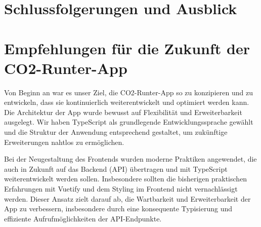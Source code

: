 \section{Schlussfolgerungen und Ausblick }

\section{Empfehlungen für die Zukunft der CO2-Runter-App}

Von Beginn an war es unser Ziel, die CO2-Runter-App so zu konzipieren und zu entwickeln, dass sie kontinuierlich weiterentwickelt und optimiert werden kann. Die Architektur der App wurde bewusst auf Flexibilität und Erweiterbarkeit ausgelegt. Wir haben TypeScript als grundlegende Entwicklungssprache gewählt und die Struktur der Anwendung entsprechend gestaltet, um zukünftige Erweiterungen nahtlos zu ermöglichen.

Bei der Neugestaltung des Frontends wurden moderne Praktiken angewendet, die auch in Zukunft auf das Backend (\acs{API}) übertragen und mit TypeScript weiterentwickelt werden sollen. Insbesondere sollten die bisherigen praktischen Erfahrungen mit Vuetify und dem Styling im Frontend nicht vernachlässigt werden. Dieser Ansatz zielt darauf ab, die Wartbarkeit und Erweiterbarkeit der App zu verbessern, insbesondere durch eine konsequente Typisierung und effiziente Aufrufmöglichkeiten der \acs{API}-Endpunkte.

